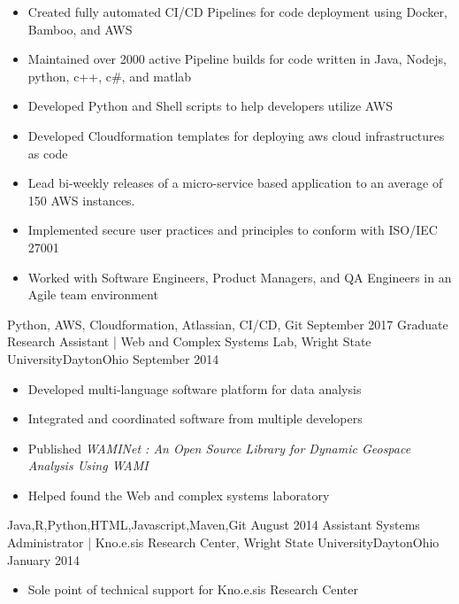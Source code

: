 \begin{experiences}
{\begin{itemize}
                        \item Created fully automated CI/CD Pipelines for code deployment using Docker, Bamboo, and AWS
                        \item Maintained over 2000 active Pipeline builds for code written in Java, Nodejs, python, c++, c\#, and matlab
                        \item Developed Python and Shell scripts to help developers utilize AWS
                        \item Developed Cloudformation templates for deploying aws cloud infrastructures as code
                        \item Lead bi-weekly releases of a micro-service based application to an average of 150 AWS instances.
                        \item Implemented secure user practices and principles to conform with ISO/IEC 27001
                        \item Worked with Software Engineers, Product Managers, and QA Engineers in an Agile team environment
                       \end{itemize}
                    }
                    {Python, AWS, Cloudformation, Atlassian, CI/CD, Git}
  \emptySeparator
  \experience
    {September 2017}   {Graduate Research Assistant | Web and Complex Systems Lab, Wright State University}{Dayton}{Ohio}
    {September 2014} {
                      \begin{itemize}
                        
                        \item Developed multi-language software platform for data analysis
                        \item Integrated and coordinated software from multiple developers
                        \item Published \textit{WAMINet : An Open Source Library for Dynamic Geospace Analysis Using WAMI}
                        \item Helped found the Web and complex systems laboratory                                                               
                      \end{itemize}
                    }
                    {Java,R,Python,HTML,Javascript,Maven,Git}
  \emptySeparator
  \experience
    {August 2014} {Assistant Systems Administrator | Kno.e.sis Research Center, Wright State University}{Dayton}{Ohio}
    {January 2014}    {
                      \begin{itemize}
                        \item Sole point of technical support for Kno.e.sis Research Center 
                       

\end{itemize}}
\end{experiences}

